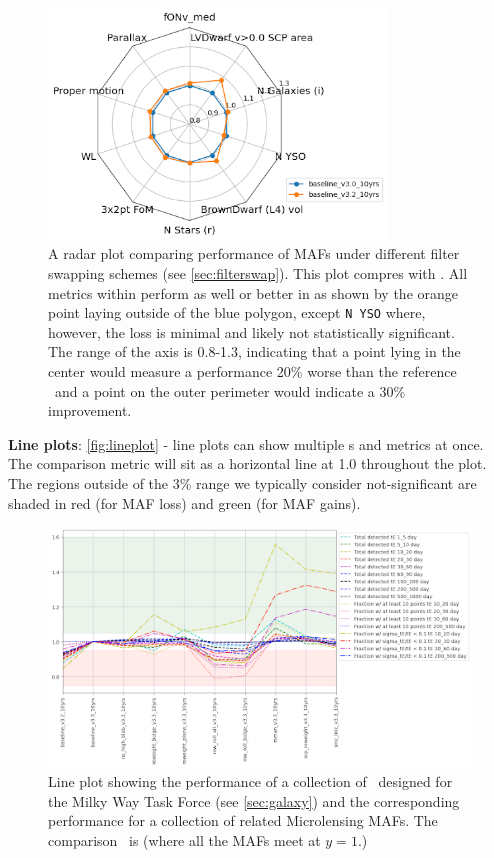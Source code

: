 \begin{figure}
\centering
\includegraphics[width=0.8\textwidth]{figures/radarplot.png}
\caption{A radar plot comparing performance of MAFs under different filter swapping schemes (see \autoref{sec:filterswap}). This plot compres  with . All metrics within perform as well or better in  as shown by the orange point laying outside of the blue polygon, except \texttt{N YSO} where, however, the loss is minimal and likely not statistically significant. The range of the axis is 0.8-1.3, indicating that a point lying in the center would measure a performance 20\% worse than the reference \opsim\ and a point on the outer perimeter would indicate a 30\% improvement.}
\label{fig:radar}
\end{figure}

\FloatBarrier

{\bf Line plots}: \autoref{fig:lineplot} -
line plots can show multiple \opsim s and metrics at once. The comparison metric will sit as a horizontal line at 1.0 throughout the plot. The regions outside of the 3\% range we typically consider not-significant are shaded in red (for MAF loss) and green (for MAF gains).


\begin{figure}
    \centering
    \includegraphics[width=0.8\linewidth]{figures/lineplot.png}
    \caption{Line plot showing the performance of a collection of \opsim\ designed for the Milky Way Task Force (see \autoref{sec:galaxy}) and the corresponding performance for a collection of related Microlensing MAFs. The comparison \opsim\ is  (where all the MAFs meet at $y=1$.)}
\label{fig:lineplot}
\end{figure}
\FloatBarrier

